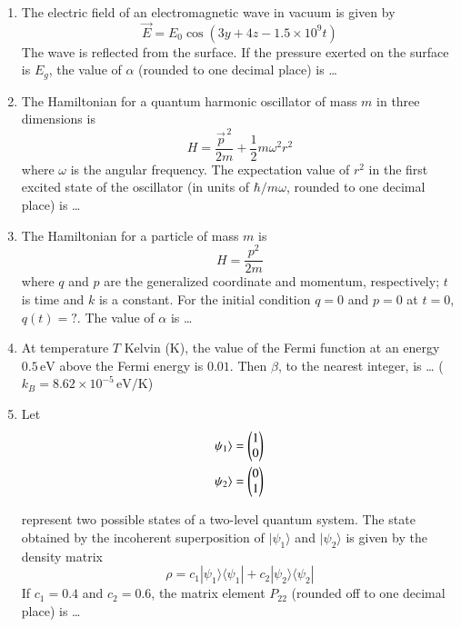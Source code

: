 \documentclass[journal,12pt,onecolumn]{IEEEtran}
\begin{document}
\begin{enumerate}[itemsep=0.45cm]
\item The electric field of an electromagnetic wave in vacuum is given by
\[
\vec{E} = E_0 \cos(3y + 4z - 1.5 \times 10^9 t)
\]  
The wave is reflected from the surface. If the pressure exerted on the surface is $E_g$, the value of $\alpha$ (rounded to one decimal place) is \dots

\hfill{}


\item The Hamiltonian for a quantum harmonic oscillator of mass $m$ in three dimensions is
\[
H = \frac{\vec{p}^{\,2}}{2m} + \frac{1}{2} m \omega^2 r^2
\]  
where $\omega$ is the angular frequency. The expectation value of $r^2$ in the first excited state of the oscillator (in units of $\hbar / m\omega$, rounded to one decimal place) is \dots

\hfill{}

\item The Hamiltonian for a particle of mass $m$ is
\[
H = \frac{p^2}{2m}
\]  
where $q$ and $p$ are the generalized coordinate and momentum, respectively; $t$ is time and $k$ is a constant. For the initial condition $q = 0$ and $p = 0$ at $t = 0$, $q(t) = ?$. The value of $\alpha$ is \dots

\hfill{}

\item At temperature $T$ Kelvin (K), the value of the Fermi function at an energy $0.5\,\mathrm{eV}$ above the Fermi energy is $0.01$. Then $\beta$, to the nearest integer, is \dots  
($k_B = 8.62 \times 10^{-5}\,\mathrm{eV/K}$)

\hfill{}

\item Let 
\begin{align}
\psi_1\rangle = \begin{pmatrix}1 \\ 0\end{pmatrix} \\
\psi_2\rangle = \begin{pmatrix}0 \\ 1\end{pmatrix}
\end{align}

represent two possible states of a two-level quantum system. The state obtained by the incoherent superposition of $|\psi_1\rangle$ and $|\psi_2\rangle$ is given by the density matrix
\[
\rho = c_1 |\psi_1\rangle \langle \psi_1| + c_2 |\psi_2\rangle \langle \psi_2|
\]  
If $c_1 = 0.4$ and $c_2 = 0.6$, the matrix element $P_{22}$ (rounded off to one decimal place) is \dots

\hfill{}


\end{enumerate}
\end{document}
